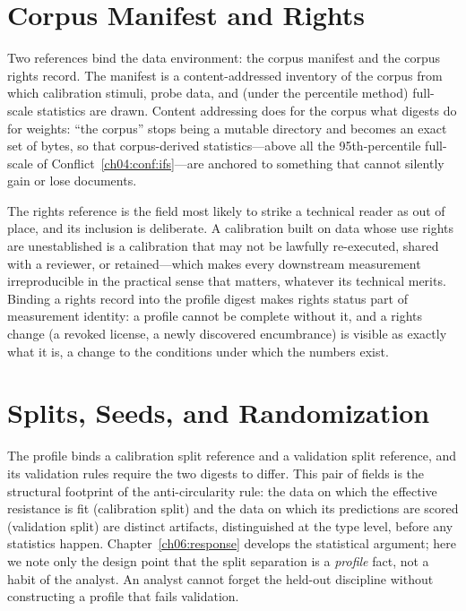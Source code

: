 \section{Corpus Manifest and Rights}\label{ch05:corpus}

Two references bind the data environment: the corpus manifest and the corpus
rights record. The manifest is a content-addressed inventory of the corpus
from which calibration stimuli, probe data, and (under the percentile
method) full-scale statistics are drawn. Content addressing does for the
corpus what digests do for weights: ``the corpus'' stops being a mutable
directory and becomes an exact set of bytes, so that corpus-derived
statistics---above all the 95th-percentile full-scale of
Conflict~\ref{ch04:conf:ifs}---are anchored to something that cannot
silently gain or lose documents.

The rights reference is the field most likely to strike a technical reader
as out of place, and its inclusion is deliberate. A calibration built on
data whose use rights are unestablished is a calibration that may not be
lawfully re-executed, shared with a reviewer, or retained---which makes
every downstream measurement irreproducible in the practical sense that
matters, whatever its technical merits. Binding a rights record into the
profile digest makes rights status part of measurement identity: a profile
cannot be complete without it, and a rights change (a revoked license, a
newly discovered encumbrance) is visible as exactly what it is, a change to
the conditions under which the numbers exist.

\section{Splits, Seeds, and Randomization}\label{ch05:splits}

The profile binds a calibration split reference and a validation split
reference, and its validation rules require the two digests to differ. This
pair of fields is the structural footprint of the anti-circularity rule: the
data on which the effective resistance is fit (calibration split) and the
data on which its predictions are scored (validation split) are distinct
artifacts, distinguished at the type level, before any statistics happen.
Chapter~\ref{ch06:response} develops the statistical argument; here we note
only the design point that the split separation is a \emph{profile} fact,
not a habit of the analyst. An analyst cannot forget the held-out discipline
without constructing a profile that fails validation.

